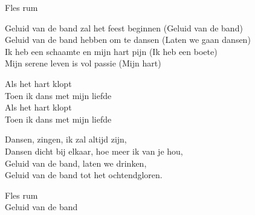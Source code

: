 \clearpage
\begin{translation}
Fles rum\vspace{\wlskip}

Geluid van de band zal het feest beginnen (Geluid van de band)\\
Geluid van de band hebben om te dansen (Laten we gaan dansen)\\
Ik heb een schaamte en mijn hart pijn (Ik heb een boete)\\
Mijn serene leven is vol passie (Mijn hart)\vspace{\wlskip}

Als het hart klopt\\
Toen ik dans met mijn liefde\\
Als het hart klopt\\
Toen ik dans met mijn liefde\vspace{\wlskip}

Dansen, zingen, ik zal altijd zijn,\\
Dansen dicht bij elkaar, hoe meer ik van je hou,\\
Geluid van de band, laten we drinken,\\
Geluid van de band tot het ochtendgloren.\vspace{\wlskip}

Fles rum\\
Geluid van de band
\end{translation}
